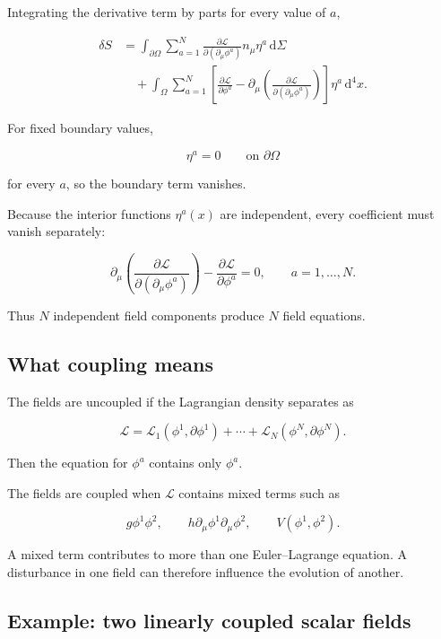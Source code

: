 Integrating the derivative term by parts for every value of \(a\),

\[
\begin{aligned}
\delta S
&=
\int_{\partial\Omega}
\sum_{a=1}^{N}
\frac{\partial\mathcal{L}}
{\partial(\partial_{\mu}\phi^{a})}
n_{\mu}\eta^{a}
\,\mathrm{d}\Sigma\\
&\quad+
\int_{\Omega}
\sum_{a=1}^{N}
\left[
\frac{\partial\mathcal{L}}{\partial\phi^{a}}
-
\partial_{\mu}
\left(
\frac{\partial\mathcal{L}}
{\partial(\partial_{\mu}\phi^{a})}
\right)
\right]
\eta^{a}
\,\mathrm{d}^{4}x.
\end{aligned}
\]

For fixed boundary values,

\[
\eta^{a}=0
\qquad
\text{on }\partial\Omega
\]

for every \(a\), so the boundary term vanishes.

Because the interior functions \(\eta^{a}(x)\) are independent, every coefficient must vanish separately:

\[
\boxed{
\partial_{\mu}
\left(
\frac{\partial\mathcal{L}}
{\partial(\partial_{\mu}\phi^{a})}
\right)
-
\frac{\partial\mathcal{L}}{\partial\phi^{a}}
=0,
\qquad
a=1,\ldots,N
}.
\]

Thus \(N\) independent field components produce \(N\) field equations.

\subsection{What coupling means}

The fields are uncoupled if the Lagrangian density separates as

\[
\mathcal{L}
=
\mathcal{L}_{1}(\phi^{1},\partial\phi^{1})
+
\cdots
+
\mathcal{L}_{N}(\phi^{N},\partial\phi^{N}).
\]

Then the equation for \(\phi^{a}\) contains only \(\phi^{a}\).

The fields are coupled when \(\mathcal{L}\) contains mixed terms such as

\[
g\phi^{1}\phi^{2},
\qquad
h\partial_{\mu}\phi^{1}\partial_{\mu}\phi^{2},
\qquad
V(\phi^{1},\phi^{2}).
\]

A mixed term contributes to more than one Euler--Lagrange equation. A disturbance in one field can therefore influence the evolution of another.

\subsection{Example: two linearly coupled scalar fields}

